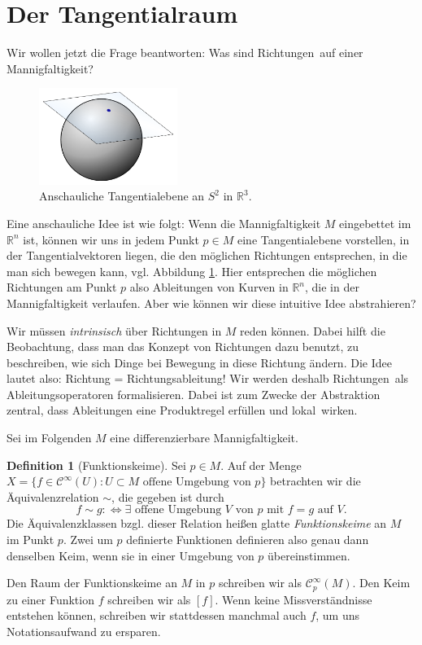 \documentclass[a4paper]{scrreprt}
\numberwithin{equation}{chapter}
\newcommand{\diff}{:\Longleftrightarrow}
\newcommand{\R}{\mathbb{R}}
\newcommand{\sC}{\mathcal{C}^{\infty}}
\theoremstyle{definition}
\newtheorem{defn}{Definition}[section]
\begin{document}
\section{Der Tangentialraum}
Wir wollen jetzt die Frage beantworten: Was sind \glqq Richtungen\grqq\ auf einer Mannigfaltigkeit?

\begin{figure} \label{fig:tngt_plane}
	\centering
	\includegraphics[width=0.4\textwidth]{Image_Tangent-plane}
	\caption{Anschauliche Tangentialebene an $S^2$ in $\R^3$.}
\end{figure}

Eine anschauliche Idee ist wie folgt: Wenn die Mannigfaltigkeit $M$ eingebettet im $\mathbb R^n$ ist, können wir uns in jedem Punkt $p \in M$ eine Tangentialebene vorstellen, in der Tangentialvektoren liegen, die den möglichen Richtungen entsprechen, in die man sich bewegen kann, vgl. Abbildung \ref{fig:tngt_plane}. Hier entsprechen die möglichen Richtungen am Punkt $p$ also Ableitungen von Kurven in $\R^n$, die in der Mannigfaltigkeit verlaufen. Aber wie können wir diese intuitive Idee abstrahieren?

Wir müssen \emph{intrinsisch} über Richtungen in $M$ reden können. Dabei hilft die Beobachtung, dass man das Konzept von Richtungen dazu benutzt, zu beschreiben, wie sich Dinge bei Bewegung in diese Richtung ändern. Die Idee lautet also: Richtung = Richtungsableitung! Wir werden deshalb \glqq Richtungen\grqq\ als Ableitungsoperatoren formalisieren. Dabei ist zum Zwecke der Abstraktion zentral, dass Ableitungen eine Produktregel erfüllen und \glqq lokal\grqq\ wirken.

	Sei im Folgenden $M$ eine differenzierbare Mannigfaltigkeit.

\begin{defn}[Funktionskeime]
	Sei $p \in M$. Auf der Menge $X = \{f \in \sC(U) : U \subset M \text{ offene Umgebung von } p\}$ betrachten wir die Äquivalenzrelation $\sim$, die gegeben ist durch
	\[f \sim g \diff \exists \text{ offene Umgebung } V \text{ von } p \text{ mit } f = g \text{ auf } V.\]
	Die Äquivalenzklassen bzgl. dieser Relation heißen glatte \emph{Funktionskeime} an $M$ im Punkt $p$. Zwei um $p$ definierte Funktionen definieren also genau dann denselben Keim, wenn sie in einer Umgebung von $p$ übereinstimmen.

	Den Raum der Funktionskeime an $M$ in $p$ schreiben wir als $\sC_p(M)$. Den Keim zu einer Funktion $f$ schreiben wir als $[f]$. Wenn keine Missverständnisse entstehen können, schreiben wir stattdessen manchmal auch $f$, um uns Notationsaufwand zu ersparen.
\end{defn}
\end{document}
